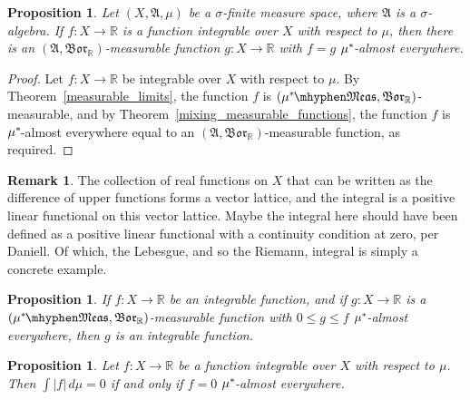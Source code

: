 \documentclass[
twoside=true,
paper=letter,
fontsize=9pt,
pagesize=auto,
leqno,
openany,
headsepline,
overfullrule,
]{scrbook}
\theoremstyle{plain}
\theoremstyle{plain}
\newtheorem{prop}[thm]{Proposition}
\theoremstyle{definition}
\newtheorem{rmk}[thm]{Remark}
\theoremstyle{bfnoteitalic}
\theoremstyle{bfnoteroman}
\newcommand{\sigalg}[1]{\mathfrak{#1}}
\newcommand{\borel}{\mathfrak{Bor}}
\newcommand{\textsigma}{\hbox{\large{$\sigma$}}\kern-1pt}
\newcommand{\abs}[1]{\left\vert#1\right\vert}
\newcommand{\R}{\mathbb{R}}
\newcommand{\sigmaalgebra}{\sigalg{A}}
\newcommand{\measurable}[1]{{#1}\mhyphen\mathfrak{Meas}}
\newcommand{\kernast}{\ast\kern-1pt}
\newcommand{\funcf}{f}
\newcommand{\funcg}{g}
\newcommand{\function}{f}
\newcommand{\functionii}{g}
\newcommand{\measurespace}{X}
\newcommand{\measure}{\mu}
\begin{document}
\begin{prop}\label{sigma_algebra_measurable}
Let $(\measurespace,\sigmaalgebra,\measure)$ be a \textsigma\hyp{}finite measure space, where $\sigmaalgebra$ is a \textsigma\hyp{}algebra.
If $f:\measurespace\to\R$ is a function integrable over $\measurespace$ with respect to $\measure$,
then there is an $(\sigmaalgebra,\borel_\R)$\hyp{}measurable
function $\funcg:\measurespace\to\R$
with $\funcf = \funcg$ $\measure^\kernast$\hyp{}almost everywhere.
\end{prop}

\begin{proof}
Let
$f:\measurespace\to\R$ be integrable over $\measurespace$ with respect to $\measure$.
By Theorem~\ref{measurable_limits},  the function $\funcf$ is
$(\measurable{\measure^\kernast}, \borel_\R)$\hyp{}measurable, and
by Theorem~\ref{mixing_measurable_functions}, the function $\funcf$ is $\measure^\kernast$\hyp{}almost everywhere equal to an $(\sigmaalgebra,\borel_\R)$\hyp{}measurable function, as required.
\end{proof}


\begin{rmk}
The collection of real functions on $\measurespace$ that can be written as the difference of upper functions forms a vector lattice, and the integral is a positive linear functional on this vector lattice. Maybe the integral here should have been defined as a positive linear functional with a continuity condition at zero, per Daniell. Of which, the Lebesgue, and so the Riemann, integral is simply a concrete example.
\end{rmk}



\begin{prop}\label{dominated_by_integrable}
If $\function:\measurespace \to \R$ be an integrable function,
and if $\functionii:\measurespace \to \R$ is a
$(\measurable{\measure^\kernast},\borel_\R)$\hyp{}measurable function with
$0\leq \functionii \leq \function$ $\measure^\kernast$\hyp{}almost everywhere, then
$\functionii$ is an integrable function.
\end{prop}



\begin{prop}\label{integral_absolute_zero}
Let $f:\measurespace\to\R$ be a function integrable over $\measurespace$ with respect to $\measure$.  
Then $\int \abs{f} \,d\measure = 0$ if and only if $f=0$ $\measure^\kernast$\hyp{}almost everywhere.
\end{prop}
\end{document}
